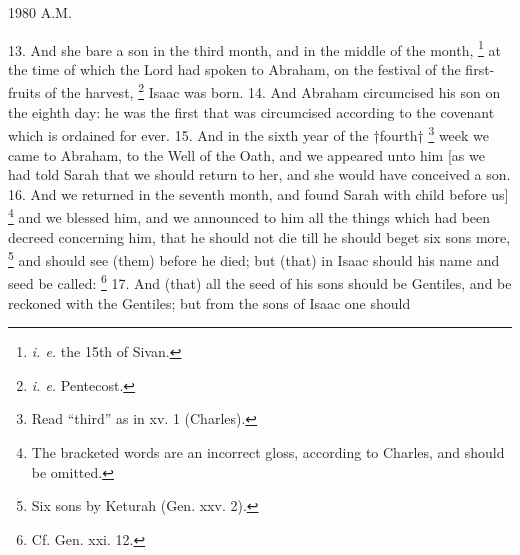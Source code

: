 1980 A.M.

13. And she bare a son in the third month, and in the middle of the month, \footnote{\emph{i. e.} the 15th of Sivan.} at the time of which the Lord had spoken to Abraham, on the festival of the first-fruits of the harvest, \footnote{\emph{i. e.} Pentecost.} Isaac was born. 14. And Abraham circumcised his son on the eighth day: he was the first that was circumcised according to the covenant which is ordained for ever. 15. And in the sixth year of the †fourth† \footnote{Read ``third'' as in xv. 1 (Charles).} week we came to Abraham, to the Well of the Oath, and we appeared unto him [as we had told Sarah that we should return to her, and she would have conceived a son. 16. And we returned in the seventh month, and found Sarah with child before us] \footnote{The bracketed words are an incorrect gloss, according to Charles, and should be omitted.} and we blessed him, and we announced to him all the things which had been decreed concerning him, that he should not die till he should beget six sons more, \footnote{Six sons by Keturah (Gen. xxv. 2).} and should see (them) before he died; but (that) in Isaac should his name and seed be called: \footnote{Cf. Gen. xxi. 12.} 17. And (that) all the seed of his sons should be Gentiles, and be reckoned with the Gentiles; but from the sons of Isaac one should

